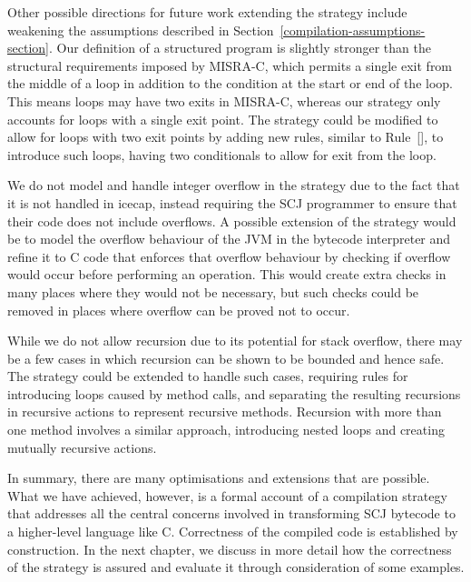 Other possible directions for future work extending the strategy
include weakening the assumptions described in
Section~\ref{compilation-assumptions-section}.
Our definition of a structured program is slightly stronger than the
structural requirements imposed by MISRA-C, which permits a single
exit from the middle of a loop in addition to the condition at the
start or end of the loop.
This means loops may have two exits in MISRA-C, whereas our strategy
only accounts for loops with a single exit point.
The strategy could be modified to allow for loops with two exit points
by adding new rules, similar to
Rule~[], to introduce such loops,
having two conditionals to allow for exit from the loop.

We do not model and handle integer overflow in the strategy due to the
fact that it is not handled in icecap, instead requiring the SCJ
programmer to ensure that their code does not include overflows.
A possible extension of the strategy would be to model the overflow
behaviour of the JVM in the bytecode interpreter and refine it to C
code that enforces that overflow behaviour by checking if overflow
would occur before performing an operation.
This would create extra checks in many places where they would not be
necessary, but such checks could be removed in places where overflow
can be proved not to occur.

While we do not allow recursion due to its potential for stack
overflow, there may be a few cases in which recursion can be shown to
be bounded and hence safe.
The strategy could be extended to handle such cases, requiring rules
for introducing loops caused by method calls, and separating the
resulting recursions in recursive actions to represent recursive
methods.
Recursion with more than one method involves a similar approach,
introducing nested loops and creating mutually recursive actions.

In summary, there are many optimisations and extensions that are
possible. 
What we have achieved, however, is a formal account of a compilation
strategy that addresses all the central concerns involved in
transforming SCJ bytecode to a higher-level language like C. 
Correctness of the compiled code is established by construction.
In the next chapter, we discuss in more detail how the correctness of
the strategy is assured and evaluate it through consideration of some
examples.

